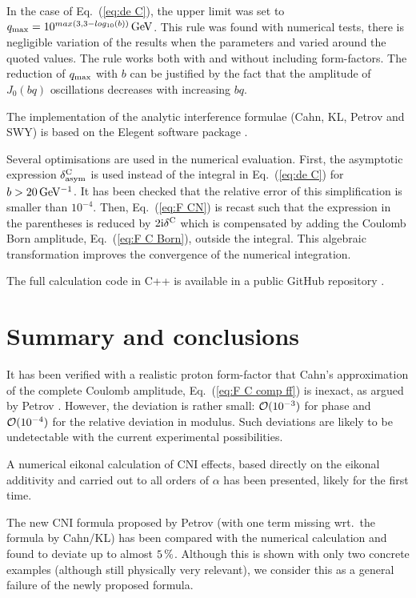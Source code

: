 \documentclass{appolb}
\def\un#1{\,{\rm #1}}
\def\I{{\rm i}}
\def\NEW#1{{#1}}
\begin{document}
In the case of Eq.~(\ref{eq:de C}), the upper limit was set to $q_{\rm max} = 10^{max(3, 3 - log_{10}(b))} \un{GeV}$. This rule was found with numerical tests, there is negligible variation of the results when the parameters and varied around the quoted values. The rule works both with and without including form-factors. The reduction of $q_{\rm max}$ with $b$ can be justified by the fact that the amplitude of $J_0(bq)$ \NEW{oscillations decreases with increasing $bq$}.

The implementation of the analytic interference formulae (Cahn, KL, Petrov and SWY) is based on the Elegent software package \cite{elegent}.

Several optimisations are used in the numerical evaluation. First, the asymptotic expression $\delta^{\rm C}_{\rm asym}$ is used instead of the integral in Eq.~(\ref{eq:de C}) for $b > 20\un{GeV^{-1}}$. It has been checked that the relative error of this simplification is smaller than $10^{-4}$. Then, Eq.~(\ref{eq:F CN}) is recast such that the expression in the parentheses is reduced by $2\I\delta^{\rm C}$ which is compensated by adding the Coulomb Born amplitude, Eq.~(\ref{eq:F C Born}), outside the integral. This algebraic transformation improves the convergence of the numerical integration.

The full calculation code in C++ is available in a public GitHub repository \cite{code}.




\section{Summary and conclusions}
\label{sec:summary}

It has been verified with a realistic proton form-factor that Cahn's approximation of the complete Coulomb amplitude, Eq.~(\ref{eq:F C comp ff}) is inexact, as argued by Petrov \cite{petrov2018}. However, the deviation is rather small: ${\cal O}(10^{-3})$ for phase and ${\cal O}(10^{-4})$ for the relative deviation in modulus. Such deviations are likely to be undetectable with the current experimental possibilities.

A numerical eikonal calculation of CNI effects, based directly on the eikonal additivity and carried out to all orders of $\alpha$ has been presented, likely for the first time.

The new CNI formula proposed by Petrov \cite{petrov2018} (with one term missing wrt.~the formula by Cahn/KL) has been compared with the numerical calculation and found to deviate up to almost $5\un{\%}$. \NEW{Although this is shown with only two concrete examples (although still physically very relevant), we consider this as a general failure of the newly proposed formula.}
\end{document}
